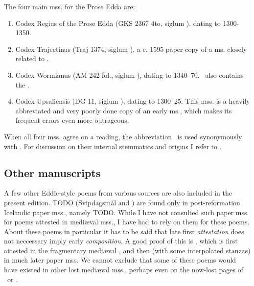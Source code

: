 The four main mss. for the Prose Edda are:%

\begin{enumerate}
  \item Codex Regius of the Prose Edda (GKS 2367 4to, siglum \RegiusProse), dating to 1300-1350.
  \item Codex Trajectinus (Traj 1374, siglum \Trajectinus), a c. 1595 paper copy of a ms. closely related to \RegiusProse.
  \item Codex Wormianus (AM 242 fol., siglum \Wormianus), dating to 1340–70. \Wormianus\ also contains the \Rigsthula.
  \item Codex Upsaliensis (DG 11, siglum \Upsaliensis), dating to 1300–25.  This mss. is a heavily abbreviated and very poorly done copy of an early ms., which makes its frequent errors even more outrageous.
\end{enumerate}

When all four mss. agree on a reading, the abbreviation \GylfMS\ is used synonymously with \RegiusProse\Trajectinus\Wormianus\Upsaliensis.  For discussion on their internal stemmatics and origins I refer to \textcite{Haukur2017}.

\subsection{Other manuscripts}

A few other Eddic-style poems from various sources are also included in the present edition.  TODO (Svipdagsmál and \Grougaldr) are found only in post-reformation Icelandic paper mss., namely TODO.  While I have not consulted such paper mss. for poems attested in mediæval mss., I have had to rely on them for these poems.  About these poems in particular it has to be said that late first \emph{attestation} does not neccessary imply early \emph{composition}.  A good proof of this is \Baldrsdraumar, which is first attested in the fragmentary mediæval \AM, and then (with some interpolated stanzas) in much later paper mss.  We cannot exclude that some of these poems would have existed in other lost mediæval mss., perhaps even on the now-lost pages of \Regius\ or \AM.
